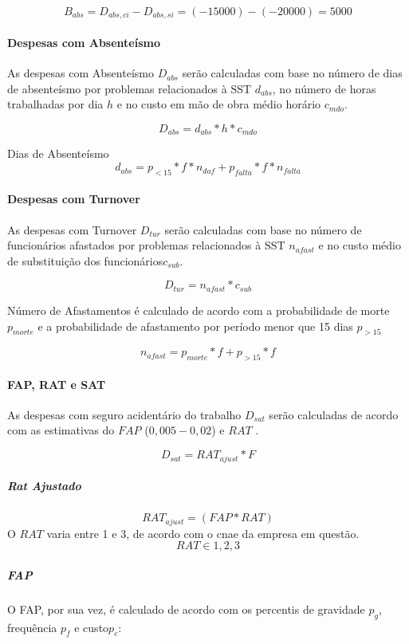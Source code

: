 \documentclass[]{article}
\let\oldparagraph\paragraph
\renewcommand{\paragraph}[1]{\oldparagraph{#1}\mbox{}}
\let\oldsubparagraph\subparagraph
\renewcommand{\subparagraph}[1]{\oldsubparagraph{#1}\mbox{}}
\begin{document}
\[B_{abs} = {D}_{abs, ci} - {D}_{abs, si} = (-15000)-(-20000) = 5000\]

\paragraph{Despesas com Absenteísmo}\label{despesas-com-absenteismo}

As despesas com Absenteísmo \(D_{abs}\) serão calculadas com base no
número de dias de absenteísmo por problemas relacionados à SST
\(d_{abs}\), no número de horas trabalhadas por dia \(h\) e no custo em
mão de obra médio horário \(c_{mdo}\).

\[D_{abs} = d_{abs} * h * c_{mdo}\]

Dias de Absenteísmo
\[ d_{abs} = p_{<15}*f*n_{daf}+p_{falta}*f*n_{falta}\]

\paragraph{Despesas com Turnover}\label{despesas-com-turnover}

As despesas com Turnover \(D_{tur}\) serão calculadas com base no número
de funcionários afastados por problemas relacionados à SST \(n_{afast}\)
e no custo médio de substituição dos funcionários\(c_{sub}\).

\[D_{tur} = n_{afast} * c_{sub}\]

Número de Afastamentos é calculado de acordo com a probabilidade de
morte \(p_{morte}\) e a probabilidade de afastamento por período menor
que 15 dias \(p_{>15}\)

\[n_{afast} = p_{morte}*f + p_{>15}*f\]

\paragraph{FAP, RAT e SAT}\label{fap-rat-e-sat}

As despesas com seguro acidentário do trabalho \(D_{sat}\) serão
calculadas de acordo com as estimativas do \(FAP\) (\(0,005 - 0,02\)) e
\(RAT\) .

\[D_{sat} = RAT_{ajust}* F\]

\subparagraph{Rat Ajustado}\label{rat-ajustado}

\[RAT_{ajust} = (FAP * RAT)\] O \(RAT\) varia entre 1 e 3, de acordo com
o cnae da empresa em questão. \[RAT \in {1,2,3}\]

\subparagraph{FAP}\label{fap}

O FAP, por sua vez, é calculado de acordo com os percentis de gravidade
\(p_g\), frequência \(p_{f}\) e custo\(p_c\):
\end{document}
